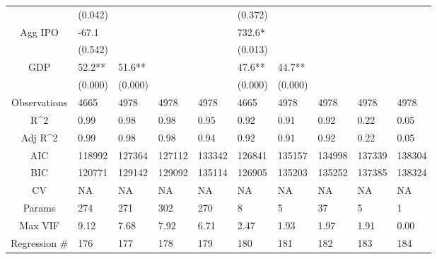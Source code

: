 \documentclass{article}
\begin{document}
\begin{table}[H]
\begin{tabular}{|clllllllll|}
   & (0.042) &  &  &  & (0.372) &  &  &  &  \\ 
  Agg IPO & -67.1 &  &  &  & 732.6* &  &  &  &  \\ 
   & (0.542) &  &  &  & (0.013) &  &  &  &  \\ 
  GDP & 52.2** & 51.6** &  &  & 47.6** & 44.7** &  &  &  \\ 
   & (0.000) & (0.000) &  &  & (0.000) & (0.000) &  &  &  \\ 
  \hline 
 Observations & 4665 & 4978 & 4978 & 4978 & 4665 & 4978 & 4978 & 4978 & 4978 \\ 
  R^2 & 0.99 & 0.98 & 0.98 & 0.95 & 0.92 & 0.91 & 0.92 & 0.22 & 0.05 \\ 
  Adj R^2 & 0.99 & 0.98 & 0.98 & 0.94 & 0.92 & 0.91 & 0.92 & 0.22 & 0.05 \\ 
  AIC & 118992 & 127364 & 127112 & 133342 & 126841 & 135157 & 134998 & 137339 & 138304 \\ 
  BIC & 120771 & 129142 & 129092 & 135114 & 126905 & 135203 & 135252 & 137385 & 138324 \\ 
  CV & NA & NA & NA & NA & NA & NA & NA & NA & NA \\ 
  Params & 274 & 271 & 302 & 270 & 8 & 5 & 37 & 5 & 1 \\ 
  Max VIF & 9.12 & 7.68 & 7.92 & 6.71 & 2.47 & 1.93 & 1.97 & 1.91 & 0.00 \\ 
  Regression \# & 176 & 177 & 178 & 179 & 180 & 181 & 182 & 183 & 184 \\ 
   \hline
\end{tabular}
 
\end{table}
\end{document}
